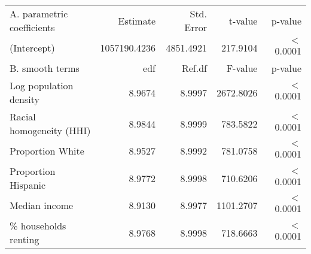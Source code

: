 \begin{table}[ht]
\centering
\begin{tabular}{lrrrr}
   \hline
A. parametric coefficients & Estimate & Std. Error & t-value & p-value \\ 
  (Intercept) & 1057190.4236 & 4851.4921 & 217.9104 & $<$ 0.0001 \\ 
   \hline
B. smooth terms & edf & Ref.df & F-value & p-value \\ 
  Log population density & 8.9674 & 8.9997 & 2672.8026 & $<$ 0.0001 \\ 
  Racial homogeneity (HHI) & 8.9844 & 8.9999 & 783.5822 & $<$ 0.0001 \\ 
  Proportion White & 8.9527 & 8.9992 & 781.0758 & $<$ 0.0001 \\ 
  Proportion Hispanic & 8.9772 & 8.9998 & 710.6206 & $<$ 0.0001 \\ 
  Median income & 8.9130 & 8.9977 & 1101.2707 & $<$ 0.0001 \\ 
  \% households renting & 8.9768 & 8.9998 & 718.6663 & $<$ 0.0001 \\ 
   \hline
\end{tabular}
\caption{ } 
\label{Demographic GAM}
\end{table}
